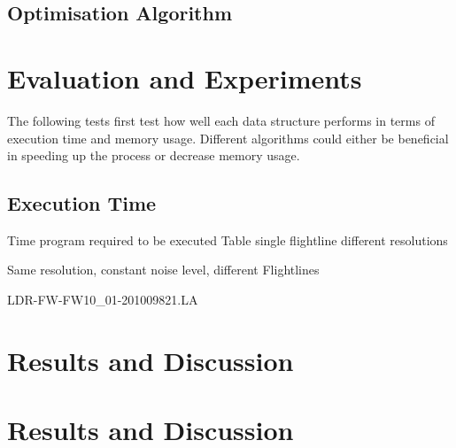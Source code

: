 \documentclass{subfiles}
\begin{document}
\subsection{Optimisation Algorithm}






\section{Evaluation and Experiments}


The following tests first test how well each data structure performs in terms of execution time and memory usage. 
Different algorithms could either be beneficial in speeding up the process or decrease memory usage. 

\subsection{Execution Time}
Time program required to be executed
Table single flightline different resolutions



Same resolution, constant noise level, different Flightlines



LDR-FW-FW10\_01-201009821.LA

\section{Results and Discussion}

\section{Results and Discussion}
\end{document}
